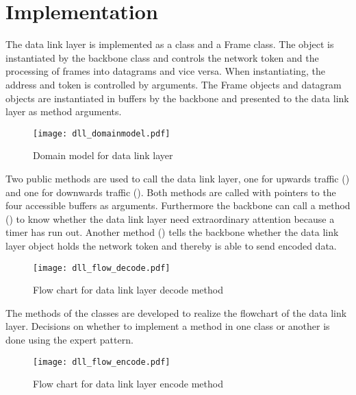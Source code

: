 \section{Implementation}
The data link layer is implemented as a  class and a Frame class.
The  object is instantiated by the backbone class and controls the
network token and the processing of frames into datagrams and vice versa. When
instantiating, the address and token is controlled by arguments. The Frame
objects and datagram objects are instantiated in buffers by the backbone and
presented to the data link layer as method arguments.

\begin{figure}[htb]
	\begin{center}
	\texttt{[image: dll\_domainmodel.pdf]}
	\caption{Domain model for data link layer}
	\label{fig:class_diag_for_datalink}	
	\end{center}
\end{figure}

Two public methods are used to call the data link layer, one for upwards traffic
() and one for downwards traffic (). Both methods are called with
pointers to the four accessible buffers as arguments. Furthermore the backbone
can call a method () to know whether the data link layer need
extraordinary attention because a timer has run out. Another method
() tells the backbone whether the data link layer object holds the
network token and thereby is able to send encoded data.

\begin{figure}[htb]
	\begin{center}
	\texttt{[image: dll\_flow\_decode.pdf]}
	\caption{Flow chart for data link layer decode method}
	\label{fig:dll_flow_decode}	
	\end{center}
\end{figure}

The methods of the classes are developed to realize the flowchart of the data
link layer. Decisions on whether to implement a method in one class or another
is done using the expert pattern.

\begin{figure}[htb]
	\begin{center}
	\texttt{[image: dll\_flow\_encode.pdf]}
	\caption{Flow chart for data link layer encode method}
	\label{fig:dll_flow_encode}	
	\end{center}
\end{figure}
